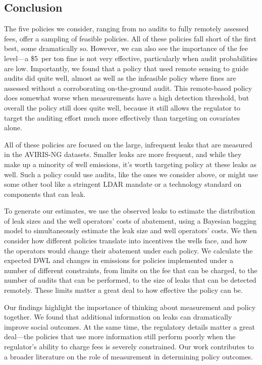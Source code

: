 \documentclass[12pt,oneside,letterpaper]{article}
\theoremstyle{definition}
\begin{document}
\begin{refsection}

\section{Conclusion}
\label{sec:conclusion}


The five policies we consider, ranging from no audits to fully remotely assessed fees, offer a sampling of feasible policies.
All of these policies fall short of the first best, some dramatically so.
However, we can also see the importance of the fee level---a \$5~per ton  fine is not very effective, particularly when audit probabilities are low.
Importantly, we found that a policy that used remote sensing to guide audits did quite well, almost as well as the infeasible policy where fines are assessed without a corroborating on-the-ground audit.
This remote-based policy does somewhat worse when measurements have a high detection threshold, but overall the policy still does quite well, because it still allows the regulator to target the auditing effort much more effectively than targeting on covariates alone.

All of these policies are focused on the large, infrequent leaks that are measured in the \gls{AVIRIS-NG} datasets.
Smaller leaks are more frequent, and while they make up a minority of well emissions, it's worth targeting policy at these leaks as well.
Such a policy could use audits, like the ones we consider above, or might use some other tool like a stringent
\gls{LDAR} %
mandate or a technology standard on components that can leak.

To generate our estimates, we use the observed leaks to estimate the distribution of leak sizes and the well operators' costs of abatement, using a Bayesian bagging model to simultaneously estimate the leak size and well operators' costs.
We then consider how different policies translate into incentives the wells face, and how the operators would change their abatement under each policy.
We calculate the expected \gls{DWL} and changes in emissions for policies implemented under a number of different constraints, from limits on the fee that can be charged, to the number of audits that can be performed, to the size of leaks that can be detected remotely.
These limits matter a great deal to how effective the policy can be.

Our findings highlight the importance of thinking about measurement and policy together.
We found that additional information on leaks can dramatically improve social outcomes.
At the same time, the regulatory details matter a great deal---the policies that use more information still perform poorly when the regulator's ability to charge fees is severely constrained.
Our work contributes to a broader literature on the role of measurement in determining policy outcomes.



\end{refsection}
\end{document}
